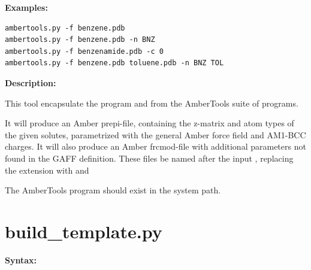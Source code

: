 \documentclass[letterpaper,10pt,english]{manual}
\begin{document}
\textbf{Examples:}

\begin{Verbatim}[commandchars=@\[\]]
ambertools.py -f benzene.pdb
ambertools.py -f benzene.pdb -n BNZ
ambertools.py -f benzenamide.pdb -c 0
ambertools.py -f benzene.pdb toluene.pdb -n BNZ TOL
\end{Verbatim}

\textbf{Description:}

This tool encapsulate the program  and  from the AmberTools suite of programs.

It will produce an Amber prepi-file, containing the z-matrix and atom types of the given solutes, parametrized with the general Amber force field and AM1-BCC charges. It will also produce an Amber frcmod-file with additional parameters not found in the GAFF definition. These files be named after the input , replacing the extension  with  and 

The AmberTools program should exist in the system path.


\section{build\_template.py}

\textbf{Syntax:}
\end{document}
